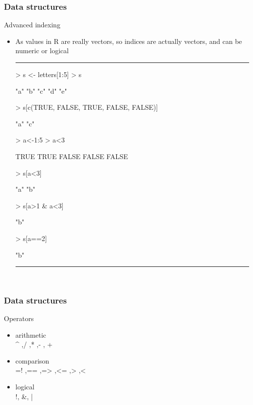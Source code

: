 \documentclass{beamer}
\begin{document}
\begin{frame}[fragile]
	\frametitle{Data structures}
	\centering \LARGE Advanced indexing
	\begin{itemize}
		\small
		\item As values in R are really vectors, so indices are actually vectors, and can be numeric or logical
\rule{\textwidth}{0.4pt}
\scriptsize
\setlength{\fancyvrbtopsep}{-1pt}
\setlength{\fancyvrbpartopsep}{-1pt}
\begin{Schunk}
\begin{Sinput}
> s <- letters[1:5]
> s
\end{Sinput}
\begin{Soutput}
[1] "a" "b" "c" "d" "e"
\end{Soutput}
\begin{Sinput}
> s[c(TRUE, FALSE, TRUE, FALSE, FALSE)]
\end{Sinput}
\begin{Soutput}
[1] "a" "c"
\end{Soutput}
\begin{Sinput}
> a<-1:5
> a<3
\end{Sinput}
\begin{Soutput}
[1]  TRUE  TRUE FALSE FALSE FALSE
\end{Soutput}
\begin{Sinput}
> s[a<3]
\end{Sinput}
\begin{Soutput}
[1] "a" "b"
\end{Soutput}
\begin{Sinput}
> s[a>1 & a<3]
\end{Sinput}
\begin{Soutput}
[1] "b"
\end{Soutput}
\begin{Sinput}
> s[a==2]
\end{Sinput}
\begin{Soutput}
[1] "b"
\end{Soutput}
\end{Schunk}

\rule{\textwidth}{0.4pt}\\
\small
	\end{itemize}
\end{frame}

\begin{frame}[fragile]
	\frametitle{Data structures}
	\centering \LARGE Operators
	\begin{itemize}
		\small
		\item arithmetic\\ \^{} ,/ ,* ,- , +
		\item comparison\\ =! ,== ,=> ,<= ,> ,<
		\item logical\\ !, \&, |
	\end{itemize}
\end{frame}
\end{document}
